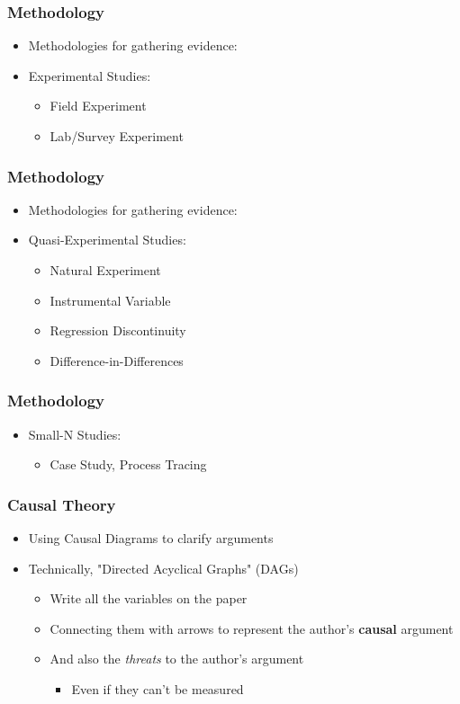 \documentclass[xcolor=x11names,compress]{beamer}\usepackage[]{graphicx}\usepackage[]{color}
\renewcommand{\(}{\begin{columns}}
\renewcommand{\)}{\end{columns}}
\newcommand{\<}[1]{\begin{column}{#1}}
\renewcommand{\>}{\end{column}}
\begin{document}
\begin{frame}
\frametitle{Methodology}
\begin{itemize}
\item Methodologies for gathering evidence:
\pause
\item Experimental Studies:
\pause
\begin{itemize}
\item Field Experiment
\pause
\item Lab/Survey Experiment
\end{itemize}
\end{itemize}
\end{frame}

\begin{frame}
\frametitle{Methodology}
\begin{itemize}
\item Methodologies for gathering evidence:
\pause
\item Quasi-Experimental Studies:
\pause
\begin{itemize}
\item Natural Experiment
\pause
\item Instrumental Variable
\pause
\item Regression Discontinuity
\pause
\item Difference-in-Differences
\end{itemize}
\end{itemize}
\end{frame}

\begin{frame}
\frametitle{Methodology}
\begin{itemize}
\item Small-N Studies:
\pause
\begin{itemize}
\item Case Study, Process Tracing
\end{itemize}
\end{itemize}
\end{frame}



\begin{frame}
\frametitle{Causal Theory}
\begin{itemize}
\item Using Causal Diagrams to clarify arguments
\pause
\item Technically, "Directed Acyclical Graphs" (DAGs)
\pause
\begin{itemize}
\item Write all the variables on the paper
\pause
\item Connecting them with arrows to represent the author's \textbf{causal} argument
\pause
\item And also the \textit{threats} to the author's argument
\begin{itemize}
\item Even if they can't be measured
\end{itemize}
\end{itemize}
\end{itemize}
\end{frame}
\end{document}
